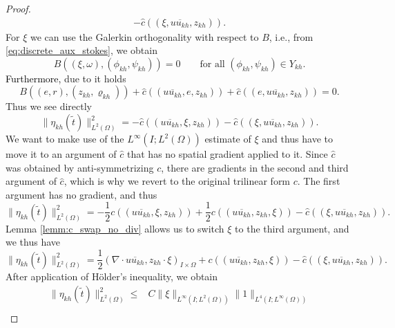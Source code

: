 \documentclass{m2an}
\newcommand\blue[1]{\textcolor{black}{#1}}
\newcommand{\IOprod}[1]{\left( #1 \right)_{I\times\Omega}}
\newcommand{\chatIO}[1]{\hat c \left(\!\left( #1 \right)\!\right)}
\newcommand{\cIO}[1]{c \left(\!\left( #1 \right)\!\right)}
\newcommand{\uukh}{\overline{uu_{kh}}}
\newcommand{\Xkh}{Y_{kh}}
\newcommand{\ukh}{u_{kh}}
\newcommand{\zkh}{z_{kh}}
\newcommand{\vkh}{v_{kh}}
\newcommand{\rhokh}{\varrho_{kh}}
\newcommand{\phikh}{\phi_{kh}}
\newcommand{\psikh}{\psi_{kh}}
\begin{document}
\begin{proof}
\begin{align*}
    - \chatIO{\xi,\uukh,\zkh}.
  \end{align*}
  For $\xi$ we can use the Galerkin orthogonality with respect to $B$, i.e., from \eqref{eq:discrete_aux_stokes},
  we obtain
  \begin{equation*}
    B((\xi,\omega),(\phikh,\psikh)) = 0 \qquad \text{for all } (\phikh, \psikh) \in \Xkh.
  \end{equation*}
  \blue{Furthermore,} due to  it holds
  \begin{equation*}
    B((e,r),(\zkh,\rhokh)) + \chatIO{\uukh,e,\zkh} + \chatIO{e,\uukh,\zkh} = 0.
  \end{equation*}
  Thus we see directly 
  \begin{equation*}
    \|\eta_{kh}(\tilde t)\|^2_{L^2(\Omega)} 
     = - \chatIO{\uukh,\xi,\zkh} - \chatIO{\xi,\uukh,\zkh}.
  \end{equation*}
  We want to make use of the $L^\infty(I;L^2(\Omega))$ estimate of $\xi$ and thus have to move it
  to an argument of $\hat c$ that has no spatial gradient applied to it.
  Since $\hat c$ was obtained by anti-symmetrizing $c$, there are gradients in the second and third
  argument of $\hat c$, which is why we revert to the original trilinear form $c$.
  The first argument has no gradient, and thus 
  \begin{equation}\label{eq:error_split_remainder}
    \|\eta_{kh}(\tilde t)\|^2_{L^2(\Omega)} 
    = - \frac{1}{2} \cIO{\uukh,\xi,\zkh} + \frac{1}{2} \cIO{\uukh,\zkh,\xi} - \chatIO{\xi,\uukh,\zkh}.
  \end{equation}
  Lemma \ref{lemm:c_swap_no_div} allows us to switch $\xi$ to the third argument, and we thus have
  \begin{equation*}
    \|\eta_{kh}(\tilde t)\|^2_{L^2(\Omega)} 
    = \frac{1}{2} \IOprod{\nabla \cdot \uukh, \zkh \cdot \xi} 
    + \cIO{\uukh,\zkh,\xi} - \chatIO{\xi,\uukh,\zkh}.
  \end{equation*}
  After application of Hölder's inequality, we obtain
  \begin{equation}\label{eq:pointwise_split_error}
  \begin{aligned}
    \|\eta_{kh}(\tilde t)\|^2_{L^2(\Omega)} 
    \le & C\|\xi\|_{L^\infty(I;L^2(\Omega))}  \|1\|_{L^4(I;L^\infty(\Omega))}\\

\end{aligned}
\end{equation}
\end{proof}
\end{document}
